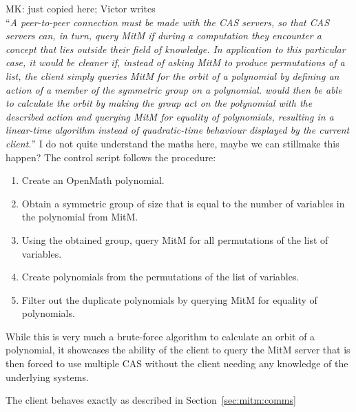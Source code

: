 \begin{oldpart}{MK: just copied here; Victor writes\\
    ``\emph{A peer-to-peer connection must be made with the CAS servers, so that CAS
      servers can, in turn, query MitM if during a computation they encounter a concept
      that lies outside their field of knowledge. In application to this particular case,
      it would be cleaner if, instead of asking MitM to produce permutations of a list,
      the client simply queries MitM for the orbit of a polynomial by defining an action
      of a member of the symmetric group on a polynomial. \GAP would then be able to
      calculate the orbit by making the group act on the polynomial with the described
      action and querying MitM for equality of polynomials, resulting in a linear-time
      algorithm instead of quadratic-time behaviour displayed by the current client.}''  I
    do not quite understand the maths here, maybe we can stillmake this happen?}
  The control script follows the procedure:
\begin{enumerate}
  \item Create an OpenMath polynomial.
  \item Obtain a symmetric group of size that is equal to the number of variables 
    in the polynomial from MitM.
  \item Using the obtained group, query MitM for all permutations of the list 
    of variables.
  \item Create polynomials from the permutations of the list of variables.
  \item Filter out the duplicate polynomials by querying MitM for equality of 
    polynomials.
\end{enumerate}
While this is very much a brute-force algorithm to calculate an orbit of a
polynomial, it showcases the ability of the client to query the MitM server that 
is then forced to use multiple CAS without the client needing any knowledge of the
underlying systems.
\end{oldpart}
The \Sage client behaves exactly as described in
Section~\ref{sec:mitm:comms}


